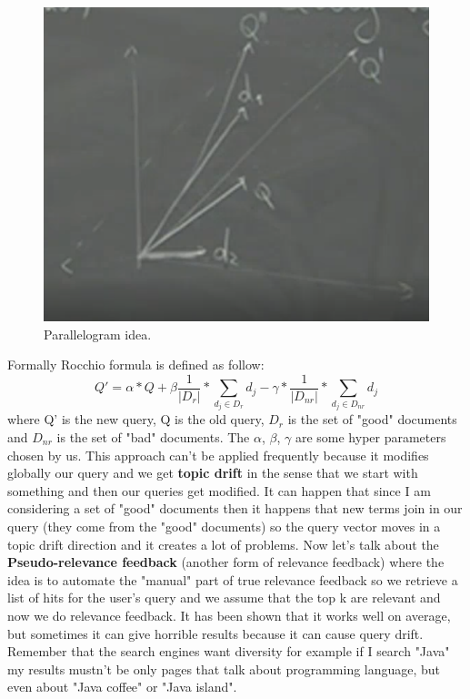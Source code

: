 \begin{figure}
    \centering
    \includegraphics[width=0.75\linewidth]{images/rocchio.PNG}
    \caption{Parallelogram idea.}
    \label{fig:rocchio}
\end{figure}
Formally Rocchio formula is defined as follow:
\begin{equation}
Q'=\alpha * Q + \beta \frac{1}{|D_r|}*\sum_{d_j \in D_r}d_j-\gamma*\frac{1}{|D_{nr}|}*\sum_{d_j \in D_{nr}}d_j
\end{equation}
where Q' is the new query, Q is the old query, $D_r$ is the set of "good" documents and $D_{nr}$ is the set of "bad" documents. The $\alpha$, $\beta$, $\gamma$ are some hyper parameters chosen by us.\newline
This approach can't be applied frequently because it modifies globally our query and we get \textbf{topic drift} in the sense that we start with something and then our queries get modified. It can happen that since I am considering a set of "good" documents then it happens that new terms join in our query (they come from the "good" documents) so the query vector moves in a topic drift direction and it creates a lot of problems.\newline
Now let's talk about the \textbf{Pseudo-relevance feedback} (another form of relevance feedback) where the idea is to automate the "manual" part of true relevance feedback so we retrieve a list of hits for the user's query and we assume that the top k are relevant and now we do relevance feedback. It has been shown that it works well on average, but sometimes it can give horrible results because it can cause query drift. Remember that the search engines want diversity for example if I search "Java" my results mustn't be only pages that talk about programming language, but even about "Java coffee" or "Java island".\newline
